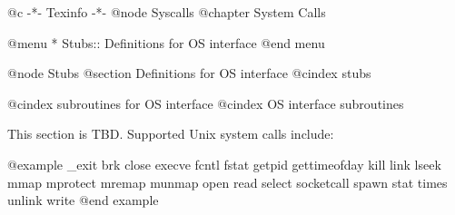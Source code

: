@c                                           -*- Texinfo -*-
@node Syscalls
@chapter System Calls

@menu
* Stubs::		Definitions for OS interface
@end menu

@node Stubs
@section Definitions for OS interface
@cindex stubs

@cindex subroutines for OS interface
@cindex OS interface subroutines

This section is TBD.  Supported Unix system calls include:

@example
_exit
brk
close
execve
fcntl
fstat
getpid
gettimeofday
kill
link
lseek
mmap
mprotect
mremap
munmap
open
read
select
socketcall
spawn
stat 
times
unlink
write 
@end example

